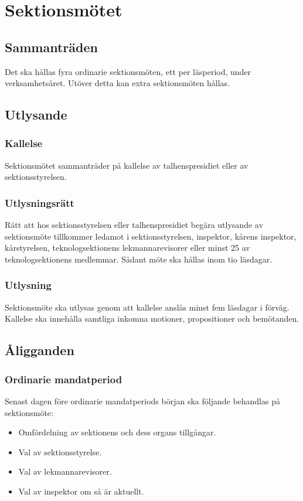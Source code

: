 \documentclass[a4paper]{dtek}
\begin{document}
\section{Sektionsmötet}
\subsection{Sammanträden}
Det ska hållas fyra ordinarie sektionsmöten, ett per läsperiod, under verksamhetsåret. Utöver detta kan extra sektionsmöten hållas.
\subsection{Utlysande}
\subsubsection{Kallelse}
Sektionsmötet sammanträder på kallelse av talhenspresidiet eller av sektionsstyrelsen.
\subsubsection{Utlysningsrätt}
Rätt att hos sektionsstyrelsen eller talhenspresidiet begära utlysande av sektionsmöte tillkommer ledamot i sektionsstyrelsen, inspektor, kårens inspektor, kårstyrelsen, teknologsektionens lekmannarevisorer eller minst 25 av teknologsektionens medlemmar. Sådant möte ska hållas inom tio läsdagar.
\subsubsection{Utlysning}
\label{sec:sektionsmote_utlysande}
Sektionsmöte ska utlysas genom att kallelse anslås minst fem läsdagar i förväg.
Kallelse ska innehålla samtliga inkomna motioner, propositioner och bemötanden.
\subsection{Åligganden}
\subsubsection{Ordinarie mandatperiod}
Senast dagen före ordinarie mandatperiods början ska följande behandlas på sektionsmöte:
\begin{itemize}
\item Omfördelning av sektionens och dess organs tillgångar.
\item Val av sektionsstyrelse.
\item Val av lekmannarevisorer.
\item Val av inspektor om så är aktuellt.
\end{itemize}
\end{document}
